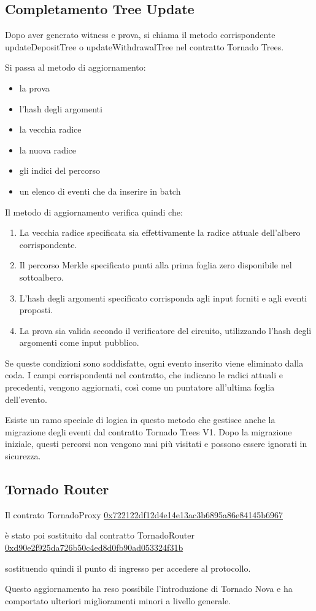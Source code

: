 \subsection{Completamento Tree Update}

Dopo aver generato witness e prova, si chiama il metodo corrispondente updateDepositTree o updateWithdrawalTree nel contratto Tornado Trees.

Si passa al metodo di aggiornamento:

\begin{itemize}
    \item la prova
    \item l'hash degli argomenti
    \item la vecchia radice
    \item la nuova radice
    \item gli indici del percorso
    \item un elenco di eventi che da inserire in batch
\end{itemize}

Il metodo di aggiornamento verifica quindi che:

\begin{enumerate}
    \item La vecchia radice specificata sia effettivamente la radice attuale dell'albero corrispondente.
    \item Il percorso Merkle specificato punti alla prima foglia zero disponibile nel sottoalbero.
    \item L'hash degli argomenti specificato corrisponda agli input forniti e agli eventi proposti.
    \item La prova sia valida secondo il verificatore del circuito, utilizzando l'hash degli argomenti come input pubblico.
\end{enumerate}

Se queste condizioni sono soddisfatte, ogni evento inserito viene eliminato dalla coda. I campi corrispondenti nel contratto, che indicano le radici attuali e precedenti, vengono aggiornati, così come un puntatore all'ultima foglia dell'evento.

Esiste un ramo speciale di logica in questo metodo che gestisce anche la migrazione degli eventi dal contratto Tornado Trees V1. Dopo la migrazione iniziale, questi percorsi non vengono mai più visitati e possono essere ignorati in sicurezza.

\subsection{Tornado Router}

Il contrato TornadoProxy \href{https://etherscan.io/address/0x722122df12d4e14e13ac3b6895a86e84145b6967}{0x722122df12d4e14e13ac3b6895a86e84145b6967}

è stato poi sostituito dal contratto TornadoRouter \href{https://etherscan.io/address/0xd90e2f925da726b50c4ed8d0fb90ad053324f31b}{0xd90e2f925da726b50c4ed8d0fb90ad053324f31b}

sostituendo quindi il punto di ingresso per accedere al protocollo.

Questo aggiornamento ha reso possibile l'introduzione di Tornado Nova e ha comportato ulteriori miglioramenti minori a livello generale.